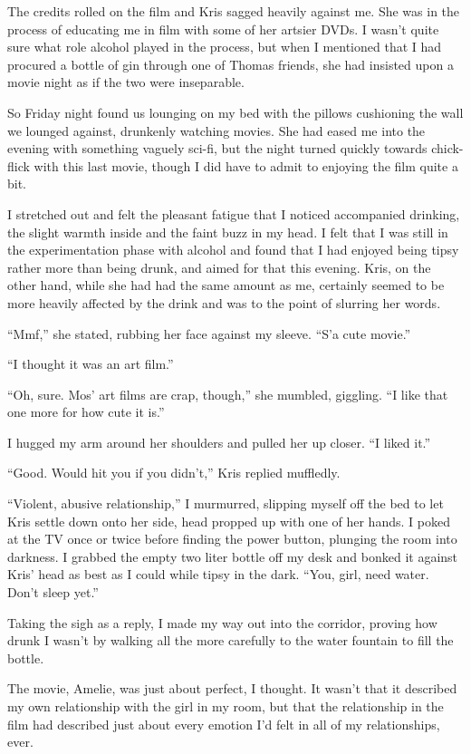 The credits rolled on the film and Kris sagged heavily against me.  She was in the process of educating me in film with some of her artsier DVDs.  I wasn't quite sure what role alcohol played in the process, but when I mentioned that I had procured a bottle of gin through one of Thomas friends, she had insisted upon a movie night as if the two were inseparable.

So Friday night found us lounging on my bed with the pillows cushioning the wall we lounged against, drunkenly watching movies.  She had eased me into the evening with something vaguely sci-fi, but the night turned quickly towards chick-flick with this last movie, though I did have to admit to enjoying the film quite a bit.

I stretched out and felt the pleasant fatigue that I noticed accompanied drinking, the slight warmth inside and the faint buzz in my head.  I felt that I was still in the experimentation phase with alcohol and found that I had enjoyed being tipsy rather more than being drunk, and aimed for that this evening.  Kris, on the other hand, while she had had the same amount as me, certainly seemed to be more heavily affected by the drink and was to the point of slurring her words.

``Mmf,'' she stated, rubbing her face against my sleeve.  ``S'a cute movie.''

``I thought it was an art film.''

``Oh, sure.  Mos' art films are crap, though,'' she mumbled, giggling.  ``I like that one more for how cute it is.''

I hugged my arm around her shoulders and pulled her up closer.  ``I liked it.''

``Good.  Would hit you if you didn't,'' Kris replied muffledly.

``Violent, abusive relationship,'' I murmurred, slipping myself off the bed to let Kris settle down onto her side, head propped up with one of her hands.  I poked at the TV once or twice before finding the power button, plunging the room into darkness.  I grabbed the empty two liter bottle off my desk and bonked it against Kris' head as best as I could while tipsy in the dark.  ``You, girl, need water.  Don't sleep  yet.''

Taking the sigh as a reply, I made my way out into the corridor, proving how drunk I wasn't by walking all the more carefully to the water fountain to fill the bottle.

The movie, Amelie, was just about perfect, I thought.  It wasn't that it described my own relationship with the girl in my room, but that the relationship in the film had described just about every emotion I'd felt in all of my relationships, ever.

